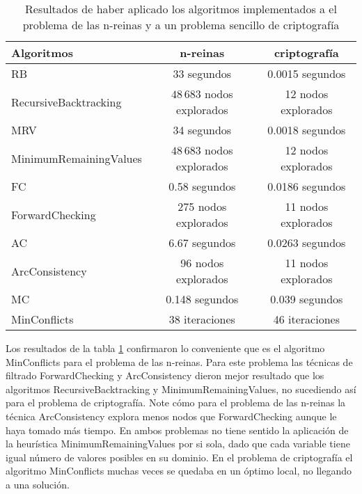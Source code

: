 \begin{table}[h]
	\caption{Resultados de haber aplicado los algoritmos implementados a el problema de las n-reinas y a un problema sencillo de criptograf\'ia}
	\begin{center}
		\label{2problemas}
		\begin{tabular}{|l|c|c||}
			\hline \hline
			\textbf{Algoritmos} & \textbf{n-reinas} & \textbf{criptograf\'ia} \\ \hline
			RB & 33 segundos & 0.0015 segundos \\
			{\tiny RecursiveBacktracking} & $48\,683$ nodos explorados & 12 nodos explorados \\ \hline
			MRV & 34 segundos &  0.0018 segundos \\
			{\tiny MinimumRemainingValues} & $48\,683$ nodos explorados & 12 nodos explorados \\ \hline
			FC & 0.58 segundos & 0.0186 segundos \\
			{\tiny ForwardChecking} & 275 nodos explorados & 11 nodos explorados \\ \hline
			AC & 6.67 segundos &  0.0263 segundos \\
			{\tiny ArcConsistency} & 96 nodos explorados & 11 nodos explorados \\ \hline
			MC & 0.148 segundos & 0.039 segundos \\
			{\tiny MinConflicts} & 38 iteraciones & 46 iteraciones \\ \hline
		\end{tabular}
	\end{center}
\end{table}

Los resultados de la tabla \ref{2problemas} confirmaron lo conveniente que es el algoritmo \textsf{MinConflicts} para el problema de las n-reinas. Para este problema las t\'ecnicas de filtrado \textsf{ForwardChecking} y \textsf{ArcConsistency} dieron mejor resultado que los algoritmos \textsf{RecursiveBacktracking} y \textsf{MinimumRemainingValues}, no sucediendo as\'i para el problema de criptograf\'ia. Note c\'omo para el problema de las n-reinas la t\'ecnica \textsf{ArcConsistency} explora menos nodos que \textsf{ForwardChecking} aunque le haya tomado m\'as tiempo. En ambos problemas no tiene sentido la aplicaci\'on de la heur\'istica \textsf{MinimumRemainingValues} por si sola, dado que cada variable tiene igual n\'umero de valores posibles en su dominio. En el problema de criptograf\'ia el algoritmo \textsf{MinConflicts} muchas veces se quedaba en un \'optimo local, no llegando a una soluci\'on.

